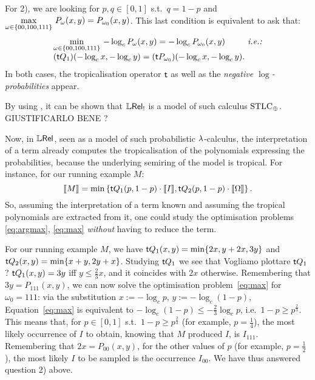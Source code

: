 For 2), %
we are looking for $p,q\in[0,1]$ s.t.\ $q=1-p$ and
$\max\limits_{\omega\in\{00,100,111\}} \, P_\omega(x,y) = P_{\omega_0}(x,y)$.
This last condition is equivalent to ask that:
\begin{equation}
  \begin{array}{l@{}l@{}}
    \min\limits_{\omega\in\set{00,100,111}} \, -\log_c P_\omega(x,y) = -\log_c P_{\omega_0}(x,y)
   & \textit{ i.e.: }
   \\
   (\trop Q_1)( -\log_c x, -\log_c y) = (\trop P_{\omega_0})( -\log_c x, -\log_c y). &  \label{eq:max}
  \end{array}
\end{equation}
In both cases, the tropicalisation operator $\mathsf{t}$ as well as the \emph{negative $\log$-probabilities} appear.

\begin{fact}
 By using \cite{Manzo2013}, it can be shown that $\mathbb{L} \mathsf{Rel}_!$ is a model of such calculus $\mathrm{STLC}_\oplus$. {\color{red}GIUSTIFICARLO BENE ?}
\end{fact}

Now, in $\mathbb{L} \mathsf{Rel}$, seen as a model of such probabilistic $\lambda$-calculus, the interpretation of a term already computes the tropicalisation of the polynomials expressing the probabilities, because the underlying semiring of the model is tropical.
For instance, for our running example $M$:
\[\llbracket M\rrbracket = \min\left\{\mathsf{t} Q_1(p,1-p) \cdot \llbracket I\rrbracket, \mathsf{t} Q_2(p,1-p) \cdot \llbracket\Omega\rrbracket\right\}.\]
So, assuming the interpretation of a term known and assuming the tropical polynomials are extracted from it, one could study the optimisation problems \ref{eq:argmax}, \ref{eq:max} \emph{without} having to reduce the term.

\begin{example}\label{ex:study}
 For our running example $M$, we have $\mathsf{t} Q_1(x,y)=\min\{2x,y+2x,3y\}$ and $\mathsf{t} Q_2(x,y)=\min\{x+y,2y+x\}$.
 Studying $\mathsf{t} Q_1$ we see that {\color{red}Vogliamo plottare $\mathsf{t} Q_1$ ?}
 $\mathsf{t} Q_1(x,y)=3y$ iff $y\leq \frac{2}{3}x$, and it coincides with $2x$ otherwise.
 Remembering that $3y=P_{111}(x,y)$, we can now solve the optimisation problem~\ref{eq:max} for $\omega_0=111$:
 via the substitution $x:=-\log_c p$, $y:=-\log_c (1-p)$, Equation~\ref{eq:max} is equivalent to $-\log_c (1-p)\leq -\frac{2}{3}\log_c p$, i.e.\ $1-p\geq p^{\frac{2}{3}}$.
 This means that, for $p\in[0,1]$ s.t.\ $1-p\geq p^{\frac{2}{3}}$ (for example, $p=\frac{1}{4}$), the most likely occurrence of $I$ to obtain, knowing that $M$ produced $I$, is $I_{111}$.
 Remembering that $2x=P_{00}(x,y)$, for the other values of $p$ (for example, $p=\frac{1}{2}$), the most likely $I$ to be sampled is the occurrence $I_{00}$.
 We have thus answered question 2) above.
\end{example}

